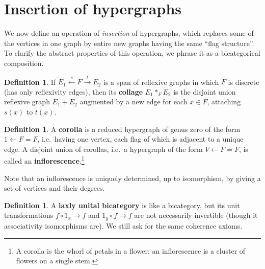 \documentclass{article}
\theoremstyle{definition}
\newtheorem{defn}[thm]{Definition}
\theoremstyle{remark}
\let\ot\leftarrow
\let\xto\xrightarrow
\let\xot\xleftarrow
\def\graph{\;\mathsf{graph}}
\let\types\vdash
\let\jdeq\equiv
\begin{document}


\section{Insertion of hypergraphs}
\label{sec:insertion}

We now define an operation of \emph{insertion} of hypergraphs, which replaces some of the vertices in one graph by entire new graphs having the same ``flag structure''.
To clarify the abstract properties of this operation, we phrase it as a bicategorical composition.

\begin{defn}
  If $E_1 \xot{s} F \xto{t} E_2$ is a span of reflexive graphs in which $F$ is discrete (has only reflexivity edges), then its \textbf{collage} $E_1 *_F E_2$ is the disjoint union reflexive graph $E_1+E_2$ augmented by a new edge for each $x\in F$, attaching $s(x)$ to $t(x)$.
\end{defn}

\begin{defn}
  A \textbf{corolla} is a reduced hypergraph of genus zero of the form $1 \ot F = F$, i.e.\ having one vertex, each flag of which is adjacent to a unique edge.
  A disjoint union of corollas, i.e.\ a hypergraph of the form $V \ot F = F$, is called an \textbf{inflorescence}.\footnote{A corolla is the whorl of petals in a flower; an inflorescence is a cluster of flowers on a single stem.}
\end{defn}

Note that an inflorescence is uniquely determined, up to isomorphism, by giving a set of vertices and their degrees.

\begin{defn}
  A \textbf{laxly unital bicategory} is like a bicategory, but its unit transformations $f \circ 1_x \to f$ and $1_y\circ f \to f$ are not necessarily invertible (though it associativity isomorphisms are).
  We still ask for the same coherence axioms.
\end{defn}
\end{document}
